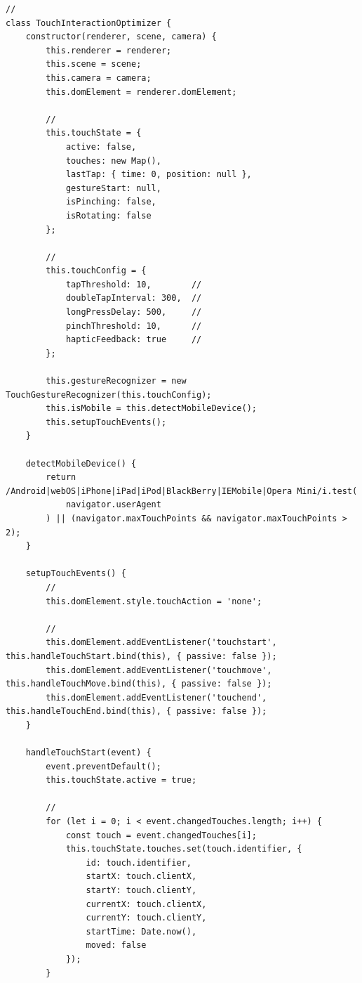 \begin{verbatim}
// 
class TouchInteractionOptimizer {
    constructor(renderer, scene, camera) {
        this.renderer = renderer;
        this.scene = scene;
        this.camera = camera;
        this.domElement = renderer.domElement;
        
        // 
        this.touchState = {
            active: false,
            touches: new Map(),
            lastTap: { time: 0, position: null },
            gestureStart: null,
            isPinching: false,
            isRotating: false
        };
        
        // 
        this.touchConfig = {
            tapThreshold: 10,        // 
            doubleTapInterval: 300,  // 
            longPressDelay: 500,     // 
            pinchThreshold: 10,      // 
            hapticFeedback: true     // 
        };
        
        this.gestureRecognizer = new TouchGestureRecognizer(this.touchConfig);
        this.isMobile = this.detectMobileDevice();
        this.setupTouchEvents();
    }
    
    detectMobileDevice() {
        return /Android|webOS|iPhone|iPad|iPod|BlackBerry|IEMobile|Opera Mini/i.test(
            navigator.userAgent
        ) || (navigator.maxTouchPoints && navigator.maxTouchPoints > 2);
    }
    
    setupTouchEvents() {
        // 
        this.domElement.style.touchAction = 'none';
        
        // 
        this.domElement.addEventListener('touchstart', this.handleTouchStart.bind(this), { passive: false });
        this.domElement.addEventListener('touchmove', this.handleTouchMove.bind(this), { passive: false });
        this.domElement.addEventListener('touchend', this.handleTouchEnd.bind(this), { passive: false });
    }
    
    handleTouchStart(event) {
        event.preventDefault();
        this.touchState.active = true;
        
        // 
        for (let i = 0; i < event.changedTouches.length; i++) {
            const touch = event.changedTouches[i];
            this.touchState.touches.set(touch.identifier, {
                id: touch.identifier,
                startX: touch.clientX,
                startY: touch.clientY,
                currentX: touch.clientX,
                currentY: touch.clientY,
                startTime: Date.now(),
                moved: false
            });
        }
        

\end{verbatim}
